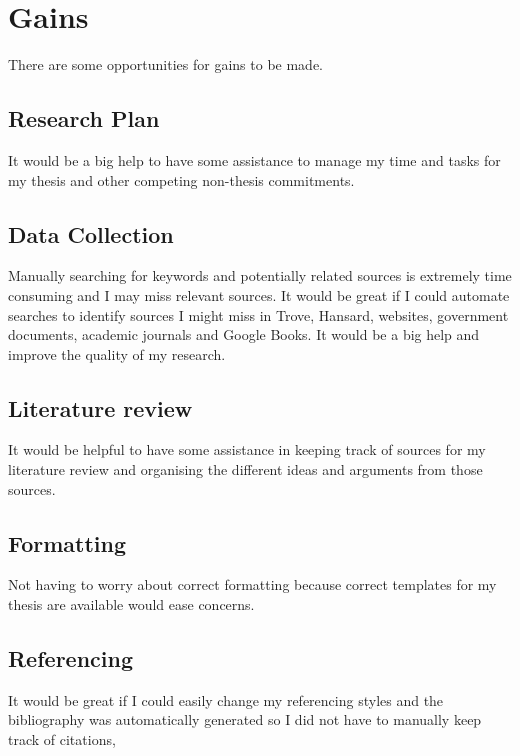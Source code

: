 \documentclass{article}
\begin{document}
\section*{Gains}
There are some opportunities for gains to be made.
\subsection*{Research Plan}

It would be a big help to have some assistance to manage my time and tasks for my thesis and other competing non-thesis commitments.\par

\par
\subsection*{Data Collection}

Manually searching for keywords and potentially related sources is extremely time consuming and I may miss relevant sources.  It would be great if I could automate searches to identify sources I might miss in Trove, Hansard, websites, government documents, academic journals and Google Books. It would be a big help and improve the quality of my research.


\subsection*{Literature review}

It would be helpful to have some assistance in keeping track of sources for my literature review and organising the different ideas and arguments from those sources.

\subsection*{Formatting}

Not having to worry about correct formatting because correct templates for my thesis are available would ease concerns.

\subsection*{Referencing}

It would be great if I could easily change my referencing styles and the bibliography was automatically generated so I did not have to manually keep track of citations,
\end{document}
